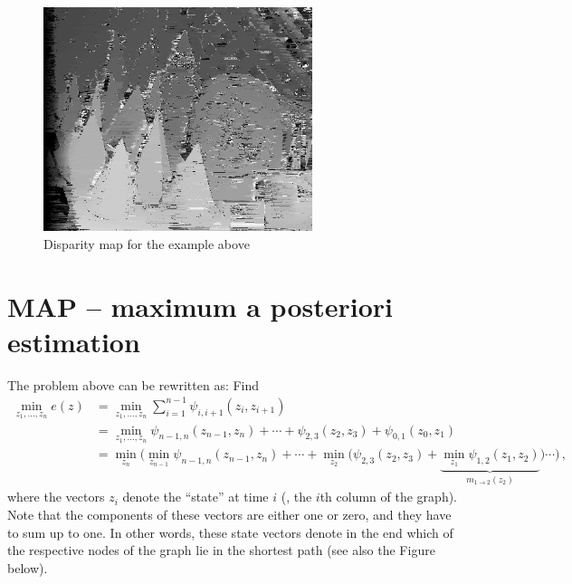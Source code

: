 \begin{figure}[htpb]
  \centering
  \includegraphics[width=0.7\textwidth]{Figures/cones_scanline_optimization_only}%
  \caption{Disparity map for the example above}%
  \label{fig:disperity_map}
\end{figure}

\section*{MAP -- maximum a posteriori estimation}
The problem above can be rewritten as: Find
\begin{align*}
  \min_{z_1, \dotsc, z_n}e(z) &= \min_{z_1, \dotsc, z_n} \sum_{i=1}^{n-1} \psi_{i,i+1}(z_i, z_{i+1}) \\
                              &= \min_{z_1, \dotsc, z_n} \psi_{n-1,n}(z_{n-1}, z_n) + \dotsm + \psi_{2,3}(z_{2}, z_3) + \psi_{0,1}(z_{0}, z_1) \\
                              &= \min_{z_n}\Bigg(
                                \min_{z_{n-1}}\psi_{n-1,n}(z_{n-1},z_n) + \dotsm + \min_{z_2}\Big(
                                \psi_{2,3}(z_2, z_3) + \underbrace{\min_{z_1}\psi_{1,2}(z_1, z_2)}_{
                                m_{1\rightarrow 2}(z_2)
                                }
                                \Big) \dotsm
                                \Bigg)\,,
\end{align*}
where the vectors $z_i$ denote the ``state'' at time $i$ (\ie, the
$i$th column of the graph). Note that the components of these vectors
are either one or zero, and they have to sum up to one. In other
words, these state vectors denote in the end which of the respective
nodes of the graph lie in the shortest path (see also the Figure
below).

